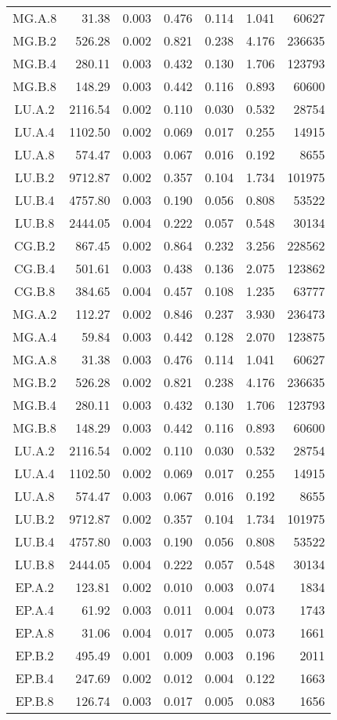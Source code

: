 \begin{longtable}[c]{c*{6}{r}}
    MG.A.8 & 31.38 & 0.003 & 0.476 & 0.114 & 1.041 & 60627 \\
    MG.B.2 & 526.28 & 0.002 & 0.821 & 0.238 & 4.176 & 236635 \\
    MG.B.4 & 280.11 & 0.003 & 0.432 & 0.130 & 1.706 & 123793 \\
    MG.B.8 & 148.29 & 0.003 & 0.442 & 0.116 & 0.893 & 60600 \\
    LU.A.2 & 2116.54 & 0.002 & 0.110 & 0.030 & 0.532 & 28754 \\
    LU.A.4 & 1102.50 & 0.002 & 0.069 & 0.017 & 0.255 & 14915 \\
    LU.A.8 & 574.47 & 0.003 & 0.067 & 0.016 & 0.192 & 8655 \\
    LU.B.2 & 9712.87 & 0.002 & 0.357 & 0.104 & 1.734 & 101975 \\
    LU.B.4 & 4757.80 & 0.003 & 0.190 & 0.056 & 0.808 & 53522 \\
    LU.B.8 & 2444.05 & 0.004 & 0.222 & 0.057 & 0.548 & 30134 \\
    CG.B.2 & 867.45 & 0.002 & 0.864 & 0.232 & 3.256 & 228562 \\
    CG.B.4 & 501.61 & 0.003 & 0.438 & 0.136 & 2.075 & 123862 \\
    CG.B.8 & 384.65 & 0.004 & 0.457 & 0.108 & 1.235 & 63777 \\
    MG.A.2 & 112.27 & 0.002 & 0.846 & 0.237 & 3.930 & 236473 \\
    MG.A.4 & 59.84 & 0.003 & 0.442 & 0.128 & 2.070 & 123875 \\
    MG.A.8 & 31.38 & 0.003 & 0.476 & 0.114 & 1.041 & 60627 \\
    MG.B.2 & 526.28 & 0.002 & 0.821 & 0.238 & 4.176 & 236635 \\
    MG.B.4 & 280.11 & 0.003 & 0.432 & 0.130 & 1.706 & 123793 \\
    MG.B.8 & 148.29 & 0.003 & 0.442 & 0.116 & 0.893 & 60600 \\
    LU.A.2 & 2116.54 & 0.002 & 0.110 & 0.030 & 0.532 & 28754 \\
    LU.A.4 & 1102.50 & 0.002 & 0.069 & 0.017 & 0.255 & 14915 \\
    LU.A.8 & 574.47 & 0.003 & 0.067 & 0.016 & 0.192 & 8655 \\
    LU.B.2 & 9712.87 & 0.002 & 0.357 & 0.104 & 1.734 & 101975 \\
    LU.B.4 & 4757.80 & 0.003 & 0.190 & 0.056 & 0.808 & 53522 \\
    LU.B.8 & 2444.05 & 0.004 & 0.222 & 0.057 & 0.548 & 30134 \\
    EP.A.2 & 123.81 & 0.002 & 0.010 & 0.003 & 0.074 & 1834 \\
    EP.A.4 & 61.92 & 0.003 & 0.011 & 0.004 & 0.073 & 1743 \\
    EP.A.8 & 31.06 & 0.004 & 0.017 & 0.005 & 0.073 & 1661 \\
    EP.B.2 & 495.49 & 0.001 & 0.009 & 0.003 & 0.196 & 2011 \\
    EP.B.4 & 247.69 & 0.002 & 0.012 & 0.004 & 0.122 & 1663 \\
    EP.B.8 & 126.74 & 0.003 & 0.017 & 0.005 & 0.083 & 1656 \\
    \bottomrule
\end{longtable}


